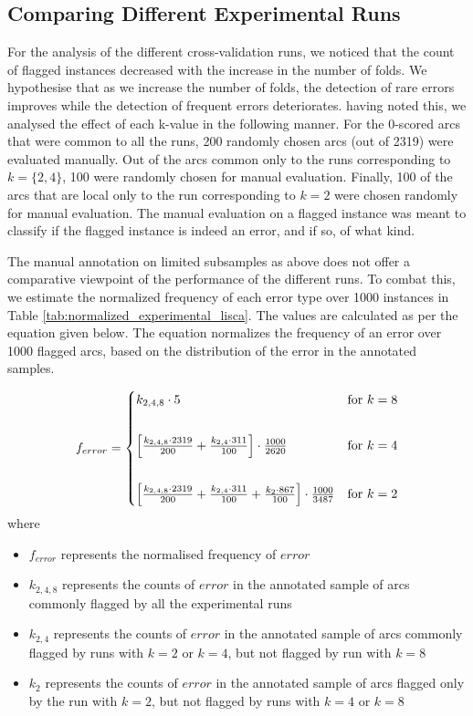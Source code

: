 \subsection{Comparing Different Experimental Runs}
\label{analysis:all}

For the analysis of the different cross-validation runs, we noticed that the count of flagged instances decreased with the increase in the number of folds. We hypothesise that as we increase the number of folds, the detection of rare errors improves while the detection of frequent errors deteriorates. having noted this, we analysed the effect of each k-value in the following manner. For the 0-scored arcs that were common to all the runs, 200 randomly chosen arcs (out of 2319) were evaluated manually. Out of the arcs common only to the runs corresponding to \(k= \{2, 4\}\), 100 were randomly chosen for manual evaluation. Finally, 100 of the arcs that are local only to the run corresponding to \(k=2\) were chosen randomly for manual evaluation. The manual evaluation on a flagged instance was meant to classify if the flagged instance is indeed an error, and if so, of what kind.

The manual annotation on limited subsamples as above does not offer a comparative viewpoint of the performance of the different runs. To combat this, we estimate the normalized frequency of each error type over 1000 instances in Table \ref{tab:normalized_experimental_lisca}. The values are calculated as per the equation given below. The equation normalizes the frequency of an error over 1000 flagged arcs, based on the distribution of the error in the annotated samples.

    \[f_{error} = 
    \begin{cases}
    k_{2,4,8} \cdot 5 &\text{for }k=8\\
    \vspace{2mm}\\
    \left[ \frac{k_{2,4,8} \cdot 2319}{200} + \frac{k_{2,4} \cdot 311}{100} \right] \cdot \frac{1000}{2620} & \text{for }k=4\\
    \vspace{2mm}\\
    \left[ \frac{k_{2,4,8} \cdot 2319}{200} + \frac{k_{2,4} \cdot 311}{100} + \frac{k_{2} \cdot 867}{100} \right] \cdot \frac{1000}{3487} & \text{for }k=2
    \end{cases}\]
where
\begin{itemize}
    \item \(f_{error}\) represents the normalised frequency of \(error\)
    \item \(k_{2,4,8}\) represents the counts of \(error\) in the annotated sample of arcs commonly flagged by all the experimental runs
    \item \(k_{2,4}\) represents the counts of \(error\) in the annotated sample of arcs commonly flagged by runs with \(k=2\) or \(k=4\), but not flagged by run with \(k=8\)
    \item \(k_{2}\) represents the counts of \(error\) in the annotated sample of arcs flagged only by the run with \(k=2\), but not flagged by runs with \(k=4\) or \(k=8\)
\end{itemize}

